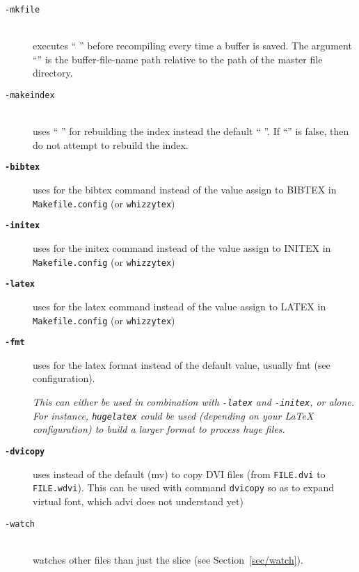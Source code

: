 \documentclass[12pt]{article}
\let \lst \verb
\begin{document}
\begin{description}
\begin{description}
\item[\texttt{-mkfile} ]\indent\\
executes `` '' before recompiling every time a
buffer is saved. The argument ``'' is the buffer-file-name
path relative to the path of the master file directory.

\item[\texttt{-makeindex} ]\indent\\
uses `` '' for rebuilding the index instead
the default `` ''.  If ``'' is
false, then do not attempt to rebuild the index.

\item[{\bf {\tt -bibtex }}]\indent

uses  for the bibtex command instead of the value 
assign to BIBTEX in \lst"Makefile.config" (or \lst"whizzytex")

\item[{\bf {\tt -initex }}]\indent

uses  for the initex command instead of the value 
assign to INITEX in \lst"Makefile.config" (or \lst"whizzytex")

\item[{\bf {\tt -latex }}]\indent

uses  for the latex command instead of the value 
assign to LATEX in \lst"Makefile.config" (or \lst"whizzytex")

\item[{\bf {\tt -fmt }}]\indent

uses  for the latex format instead
of the default value, usually fmt (see configuration).

{\em This can either be used in combination with \lst"-latex" and
\lst"-initex", 
or alone. For instance,
\lst"hugelatex" could be used (depending on your {\LaTeX} configuration) to
build a larger format to process huge files.}
\label{configuration.tex}

\item[{\bf {\tt -dvicopy }}]\indent
\label {sec/dvicopy}

uses  instead of the default (mv) to copy DVI files
(from \lst"FILE.dvi" to \lst"FILE.wdvi"). This can be used with command
\lst"dvicopy" so as  to expand virtual font, which advi does not understand
yet) 

\item[\texttt{-watch}]\indent\\
watches other files than just the slice (see Section~\ref {sec/watch}).


\end{description}
\end{description}
\end{document}
